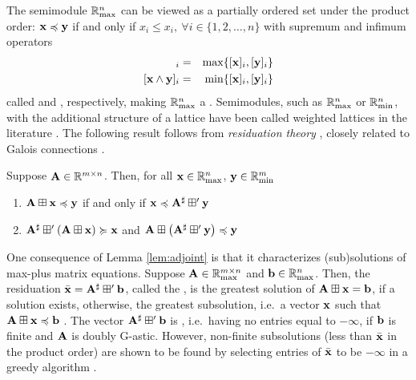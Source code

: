 \documentclass[letterpaper, 10 pt, conference]{ieeeconf}
\begin{document}
The semimodule $\mathbb{R}_{\mathrm{max}}^n$ can be viewed as a partially ordered set under the product order: $\mathbf{x} \preccurlyeq \mathbf{y}$ if and only if $x_i \leq x_i,~\forall i \in \{1,2,\dots, n\}$
with supremum and infimum operators
\begin{align}
    [\x \join \y]_i &=& \max \{ [\x]_i, [\y]_i \} \label{eq:join} \\
    [\x \meet \y]_i &=& \min \{ [\x]_i, [\y]_i \} \label{eq:meet}
\end{align}
called  and , respectively, making $\mathbb{R}_{\mathrm{max}}^n$ a  \cite{roman2008}. Semimodules, such as $\mathbb{R}_{\mathrm{max}}^n$ or $\mathbb{R}_{\mathrm{min}}^n$, with the additional structure of a lattice have been called weighted lattices in the literature \cite{maragos2017,tsilivis2022}. The following result follows from \emph{residuation theory} \cite{blyth2014}, closely related to Galois connections \cite[Chapter 7]{davey2002}.
\begin{lemma} \label{lem:adjoint}
    Suppose $\mathbf{A} \in \mathbb{R}^{m \times n}$. Then, for all $\mathbf{x} \in \mathbb{R}_{\mathrm{max}}^n$, $\mathbf{y} \in \mathbb{R}_{\mathrm{min}}^m$
    \begin{enumerate}
        \item $\mathbf{A} \boxplus \mathbf{x} \preccurlyeq \mathbf{y}$ if and only if $\mathbf{x} \preccurlyeq {\mathbf{A}}^{\sharp} \boxplus' \mathbf{y}$
        \item ${\mathbf{A}}^{\sharp} \boxplus' \left( \mathbf{A} \boxplus \mathbf{x} \right) \succcurlyeq \mathbf{x}$ and $\mathbf{A} \boxplus \left( {\mathbf{A}}^{\sharp} \boxplus' \mathbf{y} \right) \preccurlyeq \mathbf{y}$
    \end{enumerate}
\end{lemma}

One consequence of Lemma \ref{lem:adjoint} is that it characterizes (sub)solutions of max-plus matrix equations. Suppose $\mathbf{A} \in \mathbb{R}_{\mathrm{max}}^{m \times n}$ and $\mathbf{b} \in \mathbb{R}_{\mathrm{max}}^n$. Then, the residuation $\bar{\mathbf{x}} = {\mathbf{A}}^{\sharp} \boxplus' \mathbf{b}$, called the , is the greatest solution of $\mathbf{A} \boxplus \mathbf{x} = \mathbf{b}$, if a solution exists, otherwise, the greatest subsolution, i.e.~a vector $\mathbf{x}$ such that $\mathbf{A} \boxplus \mathbf{x} \preccurlyeq \mathbf{b}$ \cite[Proposition 1.1]{cunninghamegreen1979}. The vector ${\mathbf{A}}^{\sharp} \boxplus' \mathbf{b}$ is , i.e.~having no entries equal to $-\infty$, if $\mathbf{b}$ is finite and $\mathbf{A}$ is doubly G-astic. However, non-finite subsolutions (less than $\bar{\mathbf{x}}$ in the product order) are shown to be found by selecting entries of $\bar{\mathbf{x}}$ to be $-\infty$ in a greedy algorithm \cite{tsiamis2019}.
\end{document}
